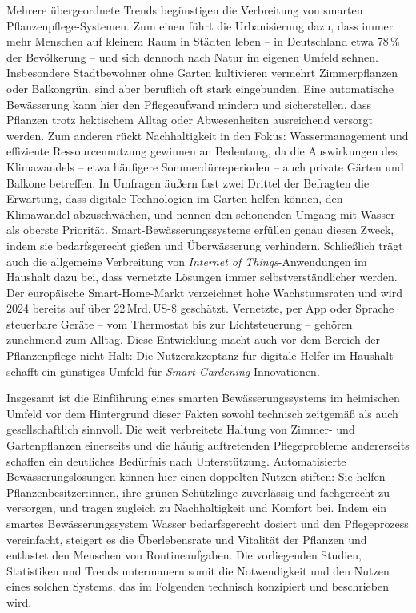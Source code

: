 Mehrere übergeordnete Trends begünstigen die Verbreitung von smarten Pflanzenpflege-Systemen. Zum einen führt die Urbanisierung dazu, dass immer mehr Menschen auf kleinem Raum in Städten leben – in Deutschland etwa 78\,\% der Bevölkerung\autocite{urbanisierung_de} – und sich dennoch nach Natur im eigenen Umfeld sehnen. Insbesondere Stadtbewohner ohne Garten kultivieren vermehrt Zimmerpflanzen oder Balkongrün, sind aber beruflich oft stark eingebunden. Eine automatische Bewässerung kann hier den Pflegeaufwand mindern und sicherstellen, dass Pflanzen trotz hektischem Alltag oder Abwesenheiten ausreichend versorgt werden. Zum anderen rückt Nachhaltigkeit in den Fokus: Wassermanagement und effiziente Ressourcennutzung gewinnen an Bedeutung, da die Auswirkungen des Klimawandels – etwa häufigere Sommerdürreperioden – auch private Gärten und Balkone betreffen. In Umfragen äußern fast zwei Drittel der Befragten die Erwartung, dass digitale Technologien im Garten helfen können, den Klimawandel abzuschwächen, und nennen den schonenden Umgang mit Wasser als oberste Priorität. Smart-Bewässerungssysteme erfüllen genau diesen Zweck, indem sie bedarfsgerecht gießen und Überwässerung verhindern. Schließlich trägt auch die allgemeine Verbreitung von \textit{Internet of Things}-Anwendungen im Haushalt dazu bei, dass vernetzte Lösungen immer selbstverständlicher werden. Der europäische Smart-Home-Markt verzeichnet hohe Wachstumsraten und wird 2024 bereits auf über 22\,Mrd.\,US-\$ geschätzt\autocite{iot_trend}. Vernetzte, per App oder Sprache steuerbare Geräte – vom Thermostat bis zur Lichtsteuerung – gehören zunehmend zum Alltag. Diese Entwicklung macht auch vor dem Bereich der Pflanzenpflege nicht Halt: Die Nutzerakzeptanz für digitale Helfer im Haushalt schafft ein günstiges Umfeld für \textit{Smart Gardening}-Innovationen.

Insgesamt ist die Einführung eines smarten Bewässerungssystems im heimischen Umfeld vor dem Hintergrund dieser Fakten sowohl technisch zeitgemäß als auch gesellschaftlich sinnvoll. Die weit verbreitete Haltung von Zimmer- und Gartenpflanzen einerseits und die häufig auftretenden Pflegeprobleme andererseits schaffen ein deutliches Bedürfnis nach Unterstützung. Automatisierte Bewässerungslösungen können hier einen doppelten Nutzen stiften: Sie helfen Pflanzenbesitzer:innen, ihre grünen Schützlinge zuverlässig und fachgerecht zu versorgen, und tragen zugleich zu Nachhaltigkeit und Komfort bei. Indem ein smartes Bewässerungssystem Wasser bedarfsgerecht dosiert und den Pflegeprozess vereinfacht, steigert es die Überlebensrate und Vitalität der Pflanzen und entlastet den Menschen von Routineaufgaben. Die vorliegenden Studien, Statistiken und Trends untermauern somit die Notwendigkeit und den Nutzen eines solchen Systems, das im Folgenden technisch konzipiert und beschrieben wird.
